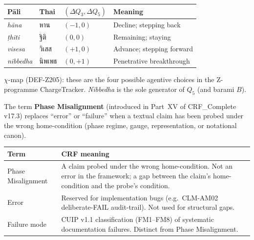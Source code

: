 \documentclass[12pt, a4paper]{article}
\begin{document}
\begin{langbox}[title={LANG-04 \textmd{---} The Four Pāli Choices ($\mathcal{C}_4$)}]
\begin{center}
\renewcommand{\arraystretch}{1.35}
\begin{tabular}{p{2.8cm} p{2.8cm} p{2.0cm} p{4.5cm}}
\toprule
\textbf{Pāli} & \textbf{Thai} & $(\Delta Q_3, \Delta Q_5)$ &
\textbf{Meaning}\\
\midrule
\emph{hāna} & หาน & $(-1, 0)$ & Decline; stepping back\\
\emph{ṭhiti} & ฐิติ & $(0, 0)$ & Remaining; staying\\
\emph{visesa} & วิเสส & $(+1, 0)$ & Advance; stepping forward\\
\emph{nibbedha} & นิพเพธ & $(0, +1)$ & Penetrative breakthrough\\
\bottomrule
\end{tabular}
\end{center}
$\chi$-map (DEF-Z205): these are the four possible agentive choices
in the Z-programme ChargeTracker. \emph{Nibbedha} is the sole
generator of $Q_5$ (and barami $B$).
\end{langbox}

\begin{langbox}[title={LANG-05 \textmd{---} Phase Misalignment vs Error}]
The term \textbf{Phase Misalignment} (introduced in Part~XV of
CRF\_Complete v17.3) replaces ``error'' or ``failure'' when a
textual claim has been probed under the wrong home-condition
(phase regime, gauge, representation, or notational canon).

\medskip
\begin{center}
\renewcommand{\arraystretch}{1.35}
\begin{tabular}{p{4.5cm} p{7.5cm}}
\toprule
\textbf{Term} & \textbf{CRF meaning}\\
\midrule
Phase Misalignment & A claim probed under the wrong home-condition.
  Not an error in the framework; a gap between the claim's
  home-condition and the probe's condition.\\
Error & Reserved for implementation bugs (e.g.\ CLM-AM02
  deliberate-FAIL audit-trail). Not used for structural gaps.\\
Failure mode & CUIP v1.1 classification (FM1--FM8) of
  systematic documentation failures. Distinct from Phase Misalignment.\\
\bottomrule
\end{tabular}
\end{center}
\end{langbox}
\end{document}
